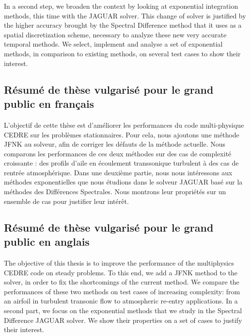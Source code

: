 In a second step, we broaden the context by looking at exponential integration methods, this time with the JAGUAR solver.
This change of solver is justified by the higher accuracy brought by the Spectral Difference method that it uses as a spatial discretization scheme, necessary to analyze these new very accurate temporal methods.
We select, implement and analyse a set of exponential methods, in comparison to existing methods, on several test cases to show their interest.


  \subsection{Résumé de thèse vulgarisé pour le grand public en français}

    \paragraph{}
L'objectif de cette thèse est d'améliorer les performances du code multi-physique CEDRE sur les problèmes stationnaires.
Pour cela, nous ajoutons une méthode JFNK au solveur, afin de corriger les défauts de la méthode actuelle.
Nous comparons les performances de ces deux méthodes sur des cas de complexité croissante : des profils d'aile en écoulement transsonique turbulent à des cas de rentrée atmosphérique.
Dans une deuxième partie, nous nous intéressons aux méthodes exponentielles que nous étudions dans le solveur JAGUAR basé sur la méthodes des Différences Spectrales.
Nous montrons leur propriétés sur un ensemble de cas pour justifier leur intérêt.


  \subsection{Résumé de thèse vulgarisé pour le grand public en anglais}

  \paragraph{}
The objective of this thesis is to improve the performance of the multiphysics CEDRE code on steady problems.
To this end, we add a JFNK method to the solver, in order to fix the shortcomings of the current method.
We compare the performances of these two methods on test cases of increasing complexity: from an airfoil in turbulent transonic flow to atmospheric re-entry applications.
In a second part, we focus on the exponential methods that we study in the Spectral Difference JAGUAR solver.
We show their properties on a set of cases to justify their interest.
